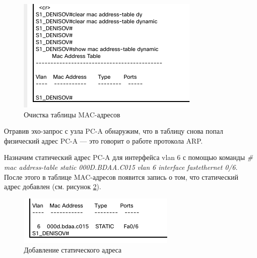 \documentclass[a4paper,14pt]{extarticle}
\begin{document}
{{{%
\begin{figure}[h!]
	\centering
	\includegraphics[width=0.7\linewidth]{images/clear-mac-table}
	\caption{Очистка таблицы MAC-адресов}
	\label{fig:clear-mac-table}
\end{figure}

Отравив эхо-запрос с узла PC-A обнаружим, что в таблицу снова попал физический адрес PC-A --- это говорит о работе протокола ARP.


Назначим статический адрес PC-A для интерфейса vlan 6 с помощью команды
\textit{\# mac address-table static 000D.BDAA.C015 vlan 6 interface fastethernet 0/6}. После этого в таблице MAC-адресов появится запись о том, что статический адрес добавлен (см. рисунок \ref{fig:static-mac}).


\begin{figure}
	\centering
	\includegraphics[width=0.7\linewidth]{images/static-mac}
	\caption{Добавление статического адреса}
	\label{fig:static-mac}
\end{figure}

}



}
}
\end{document}
